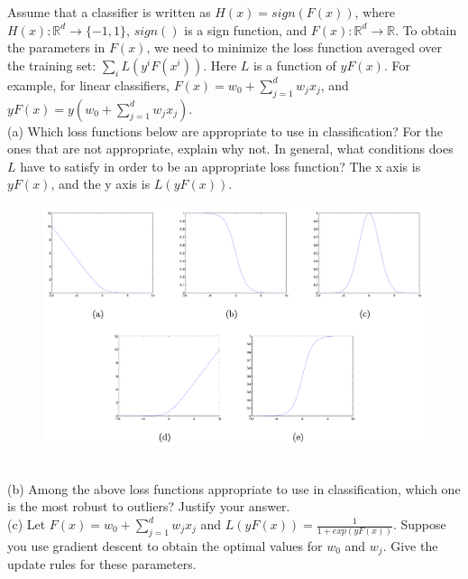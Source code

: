 \documentclass[12pt]{article}%
\begin{document}
Assume that a classifier is written as $H(x) = sign(F(x))$, where $H(x):\mathbb{R}^d \rightarrow \{-1, 1\}$, $sign()$ is a sign function, and $F(x): \mathbb{R}^d \rightarrow \mathbb{R}$. To obtain the parameters in $F(x)$, we need to minimize the loss function averaged over the training set: ${\textstyle \sum_{i}^{}}L(y^iF(x^i))$. Here $L$ is a function of $yF(x)$. For example, for linear classifiers, $F(x)=w_0 + {\textstyle \sum_{j=1}^{d}}w_jx_j$, and $yF(x) = y(w_0 + {\textstyle \sum_{j=1}^{d}}w_jx_j)$.
\vspace{1em}
\\
(a) Which loss functions below are appropriate to use in classification? For the ones that are not appropriate, explain why not. In general, what conditions does $L$ have to satisfy in order to be an appropriate loss function? The x axis is $yF(x)$, and the y axis is $L(yF(x))$.
\begin{figure}[htpb]
    \centering
    \includegraphics[scale=0.45]{partA_loss.png}
    \label{fig:enter-label}
\end{figure}
\vspace{1em}
\\
(b) Among the above loss functions appropriate to use in classification, which one is the most robust to outliers? Justify your answer.
\vspace{1em}
\\
(c) Let $F(x)=w_0+\sum_{j=1}^{d}w_jx_j$ and $L(yF(x))= \frac{1}{1+exp(yF(x))} $. Suppose you use gradient descent to obtain the optimal values for $w_0$ and $w_j$. Give the update rules for these parameters.
\pagebreak

\end{document}
